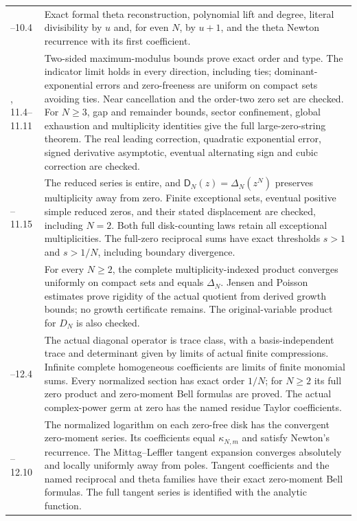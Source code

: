 \documentclass[11pt]{article}
\theoremstyle{definition}
\theoremstyle{remark}
\newcommand{\Dfun}{\mathsf D}
\begin{document}
\begin{longtable}{@{}>{\raggedright\arraybackslash}p{}>{\raggedright\arraybackslash}p{}@{}}
10.1--10.4 & Exact formal theta reconstruction, polynomial lift and degree,
literal divisibility by $u$ and, for even $N$, by $u+1$, and the theta Newton
recurrence with its first coefficient. \\
11.2, 11.4--11.11 & Two-sided maximum-modulus bounds prove exact order
and type. The indicator limit holds in every direction, including ties;
dominant-exponential errors and zero-freeness are uniform on compact sets
avoiding ties. Near cancellation and the order-two zero set are checked.
For $N\geq3$, gap and remainder bounds, sector confinement, global exhaustion
and multiplicity identities give the full large-zero-string theorem.
The real leading correction, quadratic exponential error, signed derivative
asymptotic, eventual alternating sign and cubic correction are checked. \\
11.13--11.15 & The reduced series is entire, and
$\Dfun_N(z)=\Delta_N(z^N)$ preserves multiplicity away from zero. Finite
exceptional sets, eventual positive simple reduced zeros, and their stated
displacement are checked, including $N=2$. Both full disk-counting laws
retain all exceptional multiplicities. The full-zero reciprocal sums have
exact thresholds $s>1$ and $s>1/N$, including boundary divergence. \\
12.1 & For every $N\geq2$, the complete multiplicity-indexed product
converges uniformly on compact sets and equals $\Delta_N$. Jensen and Poisson
estimates prove rigidity of the actual quotient from derived growth bounds;
no growth certificate remains. The original-variable product for $D_N$
is also checked. \\
12.2--12.4 & The actual diagonal operator is trace class, with a
basis-independent trace and determinant given by limits of actual finite
compressions. Infinite complete homogeneous coefficients are limits of finite
monomial sums. Every normalized section has exact order $1/N$; for $N\geq2$
its full zero product and zero-moment Bell formulas are proved. The actual
complex-power germ at zero has the named residue Taylor coefficients. \\
12.6--12.10 & The normalized logarithm on each zero-free disk has the
convergent zero-moment series. Its coefficients equal $\kappa_{N,m}$ and
satisfy Newton's recurrence. The Mittag--Leffler tangent expansion converges
absolutely and locally uniformly away from poles. Tangent coefficients and
the named reciprocal and theta families have their exact zero-moment Bell
formulas. The full tangent series is identified with the analytic function. \\

\end{longtable}
\end{document}
